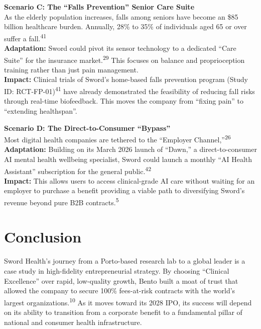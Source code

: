 \documentclass[12pt]{article}
\begin{document}
\vspace{0.5em}
\noindent \textbf{Scenario C: The ``Falls Prevention'' Senior Care Suite}\\
As the elderly population increases, falls among seniors have become an \$85 billion healthcare burden. Annually, 28\% to 35\% of individuals aged 65 or over suffer a fall.\textsuperscript{41}\\
\textbf{Adaptation:} Sword could pivot its sensor technology to a dedicated ``Care Suite'' for the insurance market.\textsuperscript{29} This focuses on balance and proprioception training rather than just pain management.\\
\textbf{Impact:} Clinical trials of Sword’s home-based falls prevention program (Study ID: RCT-FP-01)\textsuperscript{41} have already demonstrated the feasibility of reducing fall risks through real-time biofeedback. This moves the company from ``fixing pain'' to ``extending healthspan''.

\vspace{0.5em}
\noindent \textbf{Scenario D: The Direct-to-Consumer ``Bypass''}\\
Most digital health companies are tethered to the ``Employer Channel,''\textsuperscript{26}\\
\textbf{Adaptation:} Building on its March 2026 launch of ``Dawn,'' a direct-to-consumer AI mental health wellbeing specialist, Sword could launch a monthly ``AI Health Assistant'' subscription for the general public.\textsuperscript{42}\\
\textbf{Impact:} This allows users to access clinical-grade AI care without waiting for an employer to purchase a benefit providing a viable path to diversifying Sword's revenue beyond pure B2B contracts.\textsuperscript{5}

\section{Conclusion}
Sword Health’s journey from a Porto-based research lab to a global leader is a case study in high-fidelity entrepreneurial strategy. By choosing ``Clinical Excellence'' over rapid, low-quality growth, Bento built a moat of trust that allowed the company to secure 100\% fees-at-risk contracts with the world's largest organizations.\textsuperscript{10} As it moves toward its 2028 IPO, its success will depend on its ability to transition from a corporate benefit to a fundamental pillar of national and consumer health infrastructure.
\end{document}
